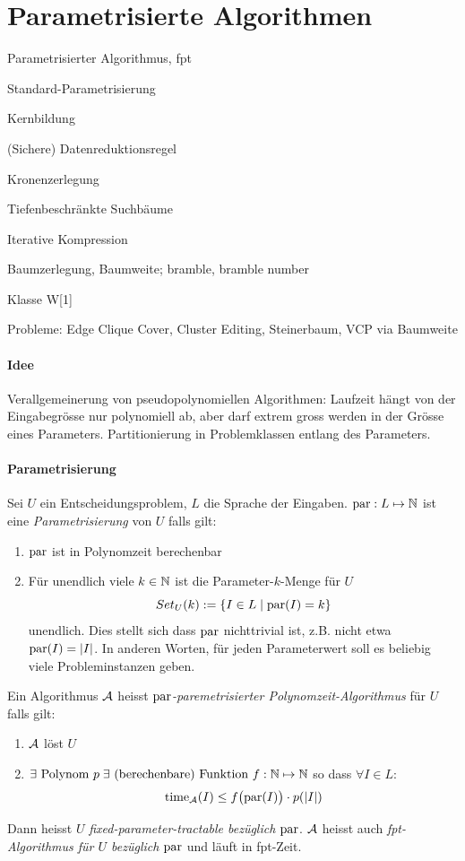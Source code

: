\section{Parametrisierte Algorithmen}

\begin{takeaway}
    \item Parametrisierter Algorithmus, fpt
    \item Standard-Parametrisierung
    \item Kernbildung
    \item (Sichere) Datenreduktionsregel
    \item Kronenzerlegung
    \item Tiefenbeschränkte Suchbäume
    \item Iterative Kompression
    \item Baumzerlegung, Baumweite; bramble, bramble number
    \item Klasse W[1]
    \item Probleme: Edge Clique Cover, Cluster Editing, Steinerbaum, VCP via Baumweite
\end{takeaway}

\paragraph{Idee}
Verallgemeinerung von pseudopolynomiellen Algorithmen:
Laufzeit hängt von der Eingabegrösse nur polynomiell ab, aber darf extrem gross werden in der Grösse eines Parameters.
Partitionierung in Problemklassen entlang des Parameters.

\paragraph{Parametrisierung}
Sei $U$ ein Entscheidungsproblem, $L$ die Sprache der Eingaben.
$\text{par}: L \mapsto \mathbb{N}$ ist eine \emph{Parametrisierung} von $U$ falls gilt:
\begin{enumerate}[label=(\roman*)]
    \item $\text{par}$ ist in Polynomzeit berechenbar
    \item Für unendlich viele $k \in \mathbb{N}$ ist die Parameter-$k$-Menge für $U$
    $$ Set_U(k) := \{ I \in L \; | \; \text{par}(I) = k \} $$ unendlich.
    Dies stellt sich dass $\text{par}$ nichttrivial ist, z.B. nicht etwa $\text{par}(I) = |I|$.
    In anderen Worten, für jeden Parameterwert soll es beliebig viele Probleminstanzen geben.
\end{enumerate}
Ein Algorithmus $\mathcal{A}$ heisst \emph{$\text{par}$-paremetrisierter Polynomzeit-Algorithmus} für $U$ falls gilt:
\begin{enumerate}[label=(\roman*)]
    \item $\mathcal{A}$ löst $U$
    \item $ \exists \text{ Polynom } p \; \exists \text{ (berechenbare) Funktion } f : \mathbb{N} \mapsto \mathbb{N}$
    so dass $\forall I \in L$:
    $$\text{time}_{\mathcal{A}}(I) \leq f \big( \text{par}(I) \big) \cdot p(|I|) $$
\end{enumerate}
Dann heisst $U$ \emph{fixed-parameter-tractable bezüglich $\text{par}$}.
$\mathcal{A}$ heisst auch \emph{fpt-Algorithmus für $U$ bezüglich $\text{par}$} und läuft in fpt-Zeit.

